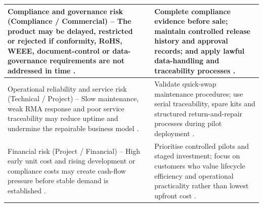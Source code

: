 \documentclass[11pt,a4paper]{article}
\begin{document}
\begin{table}[H]
\begin{tabularx}{\textwidth}{|>{\centering\arraybackslash}X|>{\centering\arraybackslash}p{1.8cm}|>{\centering\arraybackslash}X|}
Compliance and governance risk (Compliance / Commercial) -- The product may be delayed, restricted or rejected if conformity, RoHS, WEEE, document-control or data-governance requirements are not addressed in time \cite{ref19,ref20,ref22,ref29}.
& 15
& Complete compliance evidence before sale; maintain controlled release history and approval records; and apply lawful data-handling and traceability processes \cite{ref19,ref20,ref22,ref29}. \\
\hline

Operational reliability and service risk (Technical / Project) -- Slow maintenance, weak RMA response and poor service traceability may reduce uptime and undermine the repairable business model \cite{ref2,ref22,ref29}.
& 12
& Validate quick-swap maintenance procedures; use serial traceability, spare kits and structured return-and-repair processes during pilot deployment \cite{ref2,ref22}. \\
\hline

Financial risk (Project / Financial) -- High early unit cost and rising development or compliance costs may create cash-flow pressure before stable demand is established \cite{ref6,ref4}.
& 16
& Prioritise controlled pilots and staged investment; focus on customers who value lifecycle efficiency and operational practicality rather than lowest upfront cost \cite{ref6,ref4}. \\
\hline

\end{tabularx}

\normalsize
\end{table}
\end{document}
